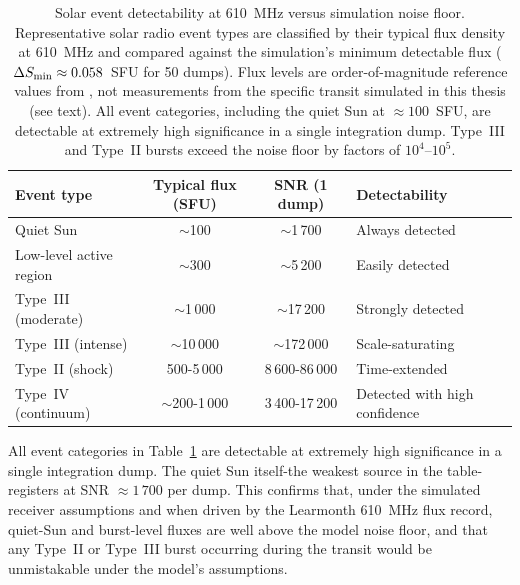 \begin{table}[H]
  \centering
  \caption[Solar event detectability at 610~MHz versus simulation noise floor]{Solar event detectability at 610~MHz versus simulation noise floor.\\[4pt]
  Representative solar radio event types are classified by their typical flux
  density at \SI{610}{\mega\hertz} and compared against the simulation's
  minimum detectable flux ($\Delta S_{\rm min}\approx0.058$~SFU for 50 dumps).
  Flux levels are order-of-magnitude reference values from
  \citet{wild1963,dulk1985,mclean1985,marque2018}, not measurements from the
  specific transit simulated in this thesis (see text). All event categories,
  including the quiet Sun at $\approx100$~SFU, are detectable at extremely high
  significance in a single integration dump. Type~III and Type~II bursts exceed
  the noise floor by factors of $10^4$--$10^5$.}
  \label{tab:detectability}
  \renewcommand{\arraystretch}{1.3}
  \begin{tabularx}{\textwidth}{l c c >{\raggedright\arraybackslash}X}
    \toprule
    \textbf{Event type} & \textbf{Typical flux (SFU)} & \textbf{SNR (1 dump)} & \textbf{Detectability} \\
    \midrule
    Quiet Sun               & $\sim$100           & $\sim$1\,700  & Always detected \\
    Low-level active region & $\sim$300           & $\sim$5\,200  & Easily detected \\
    Type~III (moderate)     & $\sim$1\,000        & $\sim$17\,200 & Strongly detected \\
    Type~III (intense)      & $\sim$10\,000       & $\sim$172\,000& Scale-saturating \\
    Type~II (shock)         & 500-5\,000         & 8\,600-86\,000 & Time-extended \\
    Type~IV (continuum)     & $\sim$200-1\,000   & 3\,400-17\,200 & Detected with high confidence \\
    \bottomrule
  \end{tabularx}
\end{table}

All event categories in Table~\ref{tab:detectability} are detectable at extremely
high significance in a single integration dump. The quiet Sun itself-the weakest
source in the table-registers at SNR $\approx1\,700$ per dump. This confirms that,
under the simulated receiver assumptions and when driven by the Learmonth
\SI{610}{\mega\hertz} flux record, quiet-Sun and burst-level fluxes are well above
the model noise floor, and that any Type~II or Type~III burst occurring during the
transit would be unmistakable under the model's assumptions.

